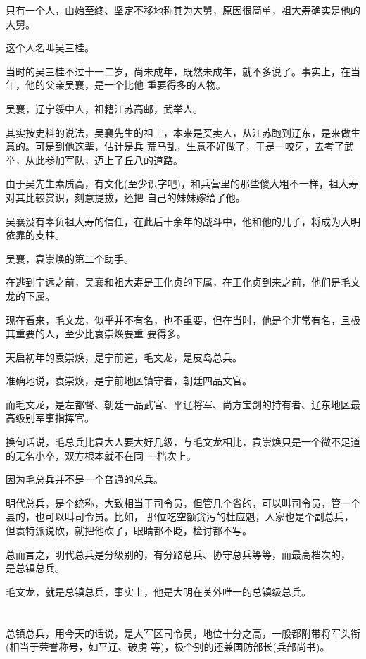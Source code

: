\documentclass[11pt,a4paper,onecolumn]{article}
\begin{document}
只有一个人，由始至终、坚定不移地称其为大舅，原因很简单，祖大寿确实是他的大舅。

这个人名叫吴三桂。

当时的吴三桂不过十一二岁，尚未成年，既然未成年，就不多说了。事实上，在当年，他的父亲吴襄，是一个比他
重要得多的人物。

吴襄，辽宁绥中人，祖籍江苏高邮，武举人。

其实按史料的说法，吴襄先生的祖上，本来是买卖人，从江苏跑到辽东，是来做生意的。可是到他这辈，估计是兵
荒马乱，生意不好做了，于是一咬牙，去考了武举，从此参加军队，迈上了丘八的道路。

由于吴先生素质高，有文化(至少识字吧)，和兵营里的那些傻大粗不一样，祖大寿对其比较赏识，刻意提拔，还把
自己的妹妹嫁给了他。

吴襄没有辜负祖大寿的信任，在此后十余年的战斗中，他和他的儿子，将成为大明依靠的支柱。

吴襄，袁崇焕的第二个助手。

在逃到宁远之前，吴襄和祖大寿是王化贞的下属，在王化贞到来之前，他们是毛文龙的下属。

现在看来，毛文龙，似乎并不有名，也不重要，但在当时，他是个非常有名，且极其重要的人，至少比袁崇焕要重
要得多。

天启初年的袁崇焕，是宁前道，毛文龙，是皮岛总兵。

准确地说，袁崇焕，是宁前地区镇守者，朝廷四品文官。

而毛文龙，是左都督、朝廷一品武官、平辽将军、尚方宝剑的持有者、辽东地区最高级别军事指挥官。

换句话说，毛总兵比袁大人要大好几级，与毛文龙相比，袁崇焕只是一个微不足道的无名小卒，双方根本就不在同
一档次上。

因为毛总兵并不是一个普通的总兵。

明代总兵，是个统称，大致相当于司令员，但管几个省的，可以叫司令员，管一个县的，也可以叫司令员。比如，
那位吃空额贪污的杜应魁，人家也是个副总兵，但袁特派说砍，就把他砍了，眼睛都不眨，检讨都不写。

总而言之，明代总兵是分级别的，有分路总兵、协守总兵等等，而最高档次的， 是总镇总兵。

毛文龙，就是总镇总兵，事实上，他是大明在关外唯一的总镇级总兵。

\section[\thesection]{}

总镇总兵，用今天的话说，是大军区司令员，地位十分之高，一般都附带将军头衔(相当于荣誉称号，如平辽、破虏
等)，极个别的还兼国防部长(兵部尚书)。
\end{document}
